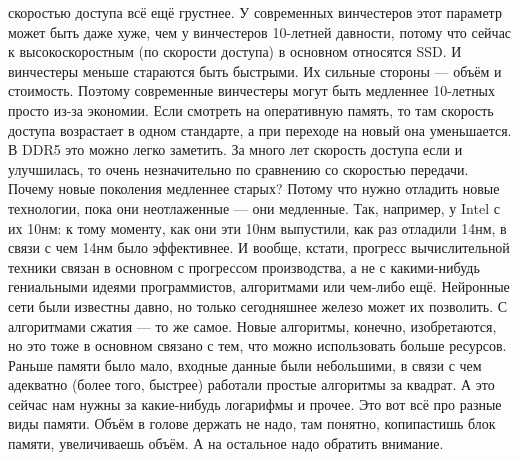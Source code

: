 \documentclass{article}
\begin{document}
скоростью доступа всё ещё грустнее. У современных винчестеров этот параметр может быть даже хуже, чем у винчестеров 10-летней давности, потому что сейчас к высокоскоростным (по скорости доступа) в основном относятся SSD. И винчестеры меньше стараются быть быстрыми. Их сильные стороны --- объём и стоимость. Поэтому современные винчестеры могут быть медленнее 10-летных просто из-за экономии. Если смотреть на оперативную память, то там скорость доступа возрастает в одном стандарте, а при переходе на новый она уменьшается. В DDR5 это можно легко заметить. За много лет скорость доступа если и улучшилась, то очень незначительно по сравнению со скоростью передачи. Почему новые поколения медленнее старых? Потому что нужно отладить новые технологии, пока они неотлаженные --- они медленные. Так, например, у Intel с их 10нм: к тому моменту, как они эти 10нм выпустили, как раз отладили 14нм, в связи с чем 14нм было эффективнее. И вообще, кстати, прогресс вычислительной техники связан в основном с прогрессом производства, а не с какими-нибудь гениальными идеями программистов, алгоритмами или чем-либо ещё. Нейронные сети были известны давно, но только сегодняшнее железо может их позволить. С алгоритмами сжатия --- то же самое. Новые алгоритмы, конечно, изобретаются, но это тоже в основном связано с тем, что можно использовать больше ресурсов. Раньше памяти было мало, входные данные были небольшими, в связи с чем адекватно (более того, быстрее) работали простые алгоритмы за квадрат. А это сейчас нам нужны за какие-нибудь логарифмы и прочее. Это вот всё про разные виды памяти. Объём в голове держать не надо, там понятно, копипастишь блок памяти, увеличиваешь объём. А на остальное надо обратить внимание.\\
\end{document}
